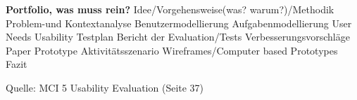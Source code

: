 \documentclass[abstracton]{scrreprt}
\begin{document}


\tableofcontents
\listoffigures









\textbf{Portfolio, was muss rein?}
  Idee/Vorgehensweise(was? warum?)/Methodik
  Problem-und Kontextanalyse
  Benutzermodellierung
  Aufgabenmodellierung
  User Needs
  Usability Testplan
  Bericht der Evaluation/Tests
  Verbesserungsvorschläge
  Paper Prototype
  Aktivitätsszenario
  Wireframes/Computer based Prototypes
  Fazit

  Quelle: MCI 5 Usability Evaluation (Seite 37)
\end{document}

